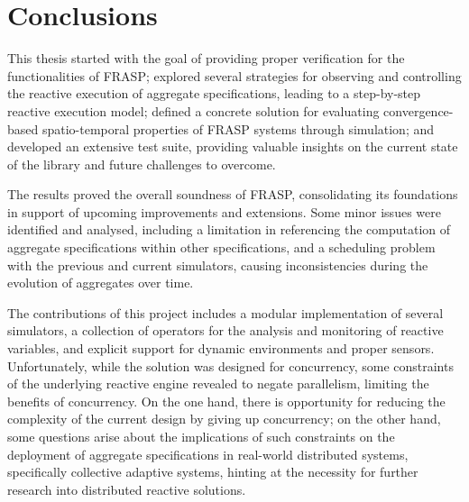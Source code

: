 
\chapter{Conclusions}
\label{chapter:conclusions}

This thesis started with the goal of providing proper verification for the
functionalities of FRASP; explored several strategies for observing and
controlling the reactive execution of aggregate specifications, leading to a
step-by-step reactive execution model; defined a concrete solution for
evaluating convergence-based spatio-temporal properties of FRASP systems
through simulation; and developed an extensive test suite, providing valuable
insights on the current state of the library and future challenges to overcome.

The results proved the overall soundness of FRASP, consolidating its
foundations in support of upcoming improvements and extensions. Some minor
issues were identified and analysed, including a limitation in referencing the
computation of aggregate specifications within other specifications, and a
scheduling problem with the previous and current simulators, causing
inconsistencies during the evolution of aggregates over time.

The contributions of this project includes a modular implementation of several
simulators, a collection of operators for the analysis and monitoring of
reactive variables, and explicit support for dynamic environments and proper
sensors. Unfortunately, while the solution was designed for concurrency, some
constraints of the underlying reactive engine revealed to negate parallelism,
limiting the benefits of concurrency. On the one hand, there is opportunity for
reducing the complexity of the current design by giving up concurrency; on the
other hand, some questions arise about the implications of such constraints on
the deployment of aggregate specifications in real-world distributed systems,
specifically collective adaptive systems, hinting at the necessity for further
research into distributed reactive solutions.
